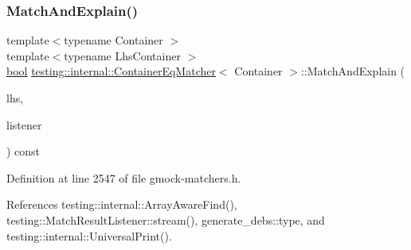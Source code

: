 \mbox{\label{classtesting_1_1internal_1_1ContainerEqMatcher_a348c6139776dd7d713d100e406ee38f4}} 
\subsubsection{\texorpdfstring{Match\+And\+Explain()}{MatchAndExplain()}}
{\footnotesize\ttfamily template$<$typename Container $>$ \\
template$<$typename Lhs\+Container $>$ \\
\hyperlink{classbool}{bool} \hyperlink{classtesting_1_1internal_1_1ContainerEqMatcher}{testing\+::internal\+::\+Container\+Eq\+Matcher}$<$ Container $>$\+::Match\+And\+Explain (\begin{DoxyParamCaption}\item[{const Lhs\+Container \&}]{lhs,  }\item[{\hyperlink{classtesting_1_1MatchResultListener}{Match\+Result\+Listener} $\ast$}]{listener }\end{DoxyParamCaption}) const\hspace{0.3cm}{\ttfamily [inline]}}



Definition at line 2547 of file gmock-\/matchers.\+h.



References testing\+::internal\+::\+Array\+Aware\+Find(), testing\+::\+Match\+Result\+Listener\+::stream(), generate\+\_\+debs\+::type, and testing\+::internal\+::\+Universal\+Print().


